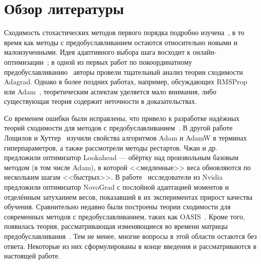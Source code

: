 \section{Обзор литературы}

Сходимость стохастических методов первого порядка подробно изучена~\citep{schneider2007stochastic, heyman2004stochastic, spall1998implementation, stich2019unified}, в то время как методы с предобуславливанием остаются относительно новыми и малоизученными. Идея адаптивного выбора шага восходит к онлайн-оптимизации~\citep{hazan2007adaptive}; в одной из первых работ по покоординатному предобуславливанию~\citep{duchi2011adaptive} авторы провели тщательный анализ теории сходимости Adagrad.
Однако в более поздних работах, например, обсуждающих RMSProp~\citep{rmsprop} или Adam~\citep{kingma2014adam}, теоретическим аспектам уделяется мало внимания, либо существующая теория содержит неточности в доказательствах.

Со временем ошибки были исправлены, что привело к разработке надёжных теорий сходимости для методов с предобуславливанием~\citep{reddi2019convergence, defossez2020simple}.
В другой работе Лощилов и Хуттер~\citep{loshchilov2017decoupled} изучили свойства алгоритмов Adam и AdamW в терминах гиперпараметров, а также рассмотрели методы рестартов. Чжан и др.~\citep{zhang2019lookahead} предложили оптимизатор Lookahead --- обёртку над произвольным базовым методом (в том числе Adam), в которой <<медленные>> веса обновляются по нескольким шагам <<быстрых>>. В работе~\citep{ginsburg2020stochastic} исследователи из Nvidia предложили оптимизатор NovoGrad с послойной адаптацией моментов и отделённым затуханием весов, показавший в их экспериментах прирост качества обучения.
Сравнительно недавно были построены теории сходимости для современных методов с предобуславливанием, таких как OASIS~\citep{jahani2021doubly, sadiev2022stochastic}.
Кроме того, появилась теория, рассматривающая изменяющиеся во времени матрицы предобуславливания~\citep{beznosikov2022scaled}.
Тем не менее, многие вопросы в этой области остаются без ответа.
Некоторые из них сформулированы в конце введения и рассматриваются в настоящей работе.
